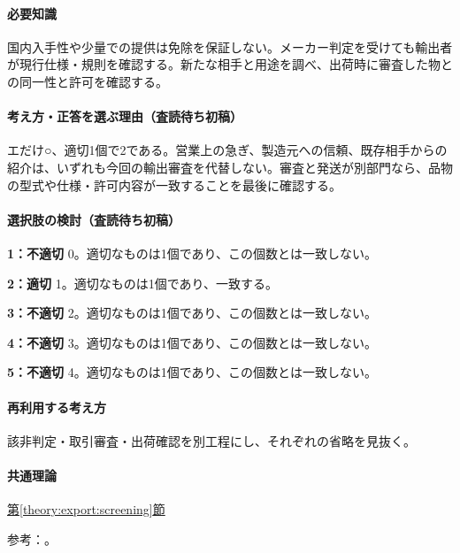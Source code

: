 \paragraph{必要知識} 国内入手性や少量での提供は免除を保証しない。メーカー判定を受けても輸出者が現行仕様・規則を確認する。新たな相手と用途を調べ、出荷時に審査した物との同一性と許可を確認する。

\paragraph{考え方・正答を選ぶ理由（査読待ち初稿）} エだけ○、適切1個で2である。営業上の急ぎ、製造元への信頼、既存相手からの紹介は、いずれも今回の輸出審査を代替しない。審査と発送が別部門なら、品物の型式や仕様・許可内容が一致することを最後に確認する。

\paragraph{選択肢の検討（査読待ち初稿）}\mbox{}\par

\noindent\textbf{1：不適切} 0。適切なものは1個であり、この個数とは一致しない。\par

\noindent\textbf{2：適切} 1。適切なものは1個であり、一致する。\par

\noindent\textbf{3：不適切} 2。適切なものは1個であり、この個数とは一致しない。\par

\noindent\textbf{4：不適切} 3。適切なものは1個であり、この個数とは一致しない。\par

\noindent\textbf{5：不適切} 4。適切なものは1個であり、この個数とは一致しない。\par

\paragraph{再利用する考え方} 該非判定・取引審査・出荷確認を別工程にし、それぞれの省略を見抜く。

\paragraph{共通理論} \hyperref[theory:export:screening]{第\ref*{theory:export:screening}節}

\par 参考：\cite{export_overview,export_current_updates}。

